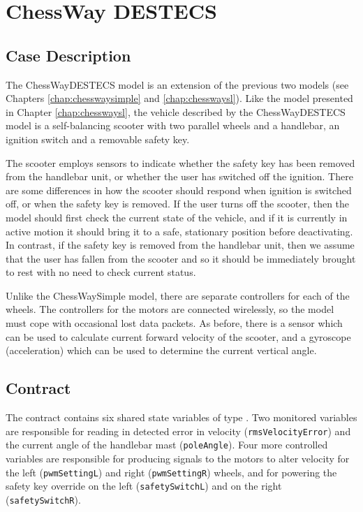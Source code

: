 \chapter{ChessWay DESTECS} \label{chap:chesswaydestecs}
\section{Case Description} The ChessWayDESTECS model is an
extension of the previous two models (see Chapters
\ref{chap:chesswaysimple} and \ref{chap:chesswaysl}). Like the model
presented in Chapter \ref{chap:chesswaysl}, the vehicle described by
the ChessWayDESTECS model is a self-balancing scooter with two parallel
wheels and a handlebar, an ignition switch and a removable safety key.

The scooter employs sensors to indicate whether the safety key has
been removed from the handlebar unit, or whether the user has switched
off the ignition. There are some differences in how the scooter should
respond when ignition is switched off, or when the safety key is
removed. If the user turns off the scooter, then the model should
first check the current state of the vehicle, and if it is currently
in active motion it should bring it to a safe, stationary position
before deactivating. In contrast, if the safety key is removed from
the handlebar unit, then we assume that the user has fallen from the
scooter and so it should be immediately brought to rest with no need
to check current status.

Unlike the ChessWaySimple model, there are separate controllers for
each of the wheels.  The controllers for the motors are connected
wirelessly, so the model must cope with occasional lost data packets.
As before, there is a sensor which can be used to calculate current
forward velocity of the scooter, and a gyroscope (acceleration) which
can be used to determine the current vertical angle.

\section{Contract} The contract contains six shared state variables of
type {\textbf{}}. Two monitored variables are responsible for
reading in detected error in velocity
(\texttt{rmsVelocityError}) and the current angle of the
handlebar mast (\texttt{poleAngle}). Four more controlled
variables are responsible for producing signals to the motors to
alter velocity for the left (\texttt{pwmSettingL}) and right
(\texttt{pwmSettingR}) wheels, and for powering the safety key
override on the left (\texttt{safetySwitchL}) and on the right
(\texttt{safetySwitchR}).

